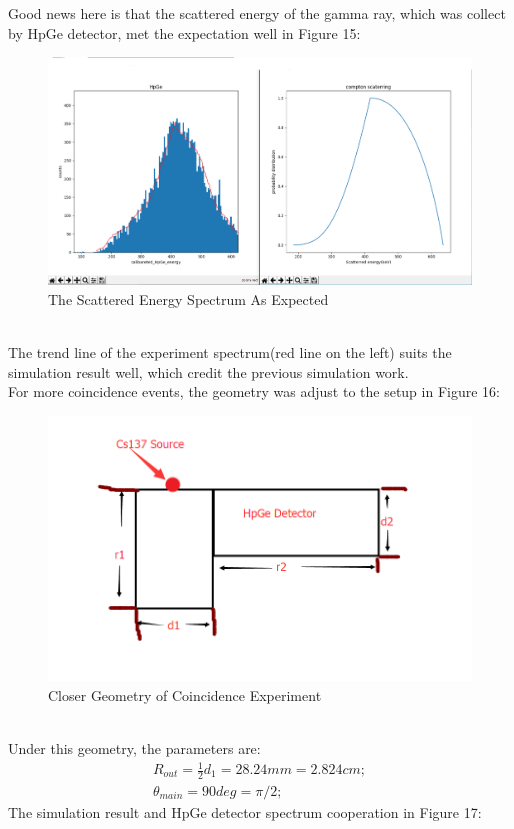 \documentclass[12pt]{article}
\begin{document}
	 Good news here is that the scattered energy of the gamma ray, which was collect by HpGe detector, met the expectation well in Figure 15:\\
	\begin{figure}[h]
		\centering
		\includegraphics[width=0.7\linewidth, height=0.15\textheight]{pic/HpGe_energy_waveform_calib}
		\caption{The Scattered Energy Spectrum As Expected}
		\label{fig:hpgeenergywaveformcalib}
	\end{figure}\\
	 The trend line of the experiment spectrum(red line on the left) suits the simulation result well, which credit the previous simulation work.\\
	 For more coincidence events, the geometry was adjust to the setup in Figure 16:
	 \begin{figure}[h]
	 	\centering
	 	\includegraphics[width=0.7\linewidth, height=0.25\textheight]{pic/Cs_137_close_geo}
	 	\caption{Closer Geometry of Coincidence Experiment}
	 	\label{fig:cs137closegeo}
	 \end{figure}\\
	 Under this geometry, the parameters are:
	 \begin{gather}
	 	R_{out}=\frac{1}{2}d_1=28.24mm=2.824cm;\\
	 	\theta_{main}=90deg=\pi /2;
	 \end{gather}
	The simulation result and HpGe detector spectrum cooperation in Figure 17:
\end{document}
